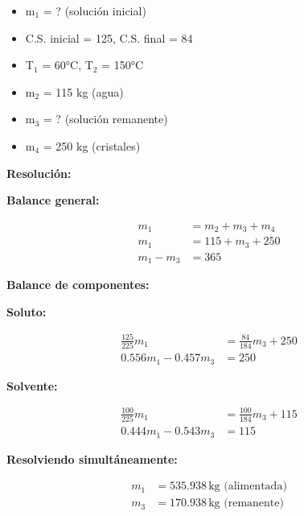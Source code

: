 \documentclass{article} %
\begin{document}
\textbf{} %
\begin{itemize}
\item m$_1$ = ? (solución inicial)
\item C.S. inicial = 125, C.S. final = 84
\item T$_1$ = 60°C, T$_2$ = 150°C
\item m$_2$ = 115 kg (agua)
\item m$_3$ = ? (solución remanente)
\item m$_4$ = 250 kg (cristales)
\end{itemize}


\noindent\textbf{Resolución:} %

\textbf{Balance general:}

\begin{align*}
    m_1 &= m_2 + m_3 + m_4 \\[10pt]
    m_1 &= 115 + m_3 + 250 \\[10pt]
    m_1 - m_3 &= 365
\end{align*}

\textbf{Balance de componentes:}

\textbf{Soluto:}

\begin{align*}
    \frac{125}{225} m_1 &= \frac{84}{184} m_3 + 250 \\[10pt]
    0.556 m_1 - 0.457 m_3 &= 250
\end{align*}

\textbf{Solvente:}

\begin{align*}
    \frac{100}{225} m_1 &= \frac{100}{184} m_3 + 115 \\[10pt]
    0.444 m_1 - 0.543 m_3 &= 115
\end{align*}

\textbf{Resolviendo simultáneamente:}

\begin{align*}
    m_1 &= 535.938 \, \text{kg (alimentada)} \\[10pt]
    m_3 &= 170.938 \, \text{kg (remanente)}
\end{align*}
\end{document}
